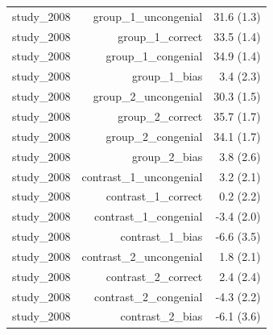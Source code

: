 \begin{tabular}{lrr}
study\_2008 & group\_1\_uncongenial & 31.6 (1.3) \\
study\_2008 & group\_1\_correct & 33.5 (1.4) \\
study\_2008 & group\_1\_congenial & 34.9 (1.4) \\
study\_2008 & group\_1\_bias & 3.4 (2.3) \\
study\_2008 & group\_2\_uncongenial & 30.3 (1.5) \\
study\_2008 & group\_2\_correct & 35.7 (1.7) \\
study\_2008 & group\_2\_congenial & 34.1 (1.7) \\
study\_2008 & group\_2\_bias & 3.8 (2.6) \\
study\_2008 & contrast\_1\_uncongenial & 3.2 (2.1) \\
study\_2008 & contrast\_1\_correct & 0.2 (2.2) \\
study\_2008 & contrast\_1\_congenial & -3.4 (2.0) \\
study\_2008 & contrast\_1\_bias & -6.6 (3.5) \\
study\_2008 & contrast\_2\_uncongenial & 1.8 (2.1) \\
study\_2008 & contrast\_2\_correct & 2.4 (2.4) \\
study\_2008 & contrast\_2\_congenial & -4.3 (2.2) \\
study\_2008 & contrast\_2\_bias & -6.1 (3.6) \\
\bottomrule
\end{tabular}
